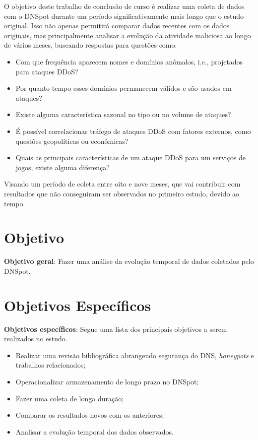 O objetivo deste trabalho de conclusão de curso é realizar uma coleta de
dados com o DNSpot durante um período significativamente mais longo
que o estudo original. Isso não apenas permitirá comparar dados
recentes com os dados originais, mas principalmente analisar a
evolução da atividade maliciosa ao longo de vários meses, buscando
respostas para questões como:

\begin{itemize}
\item Com que frequência aparecem nomes e domínios anômalos, i.e.,
  projetados para ataques DDoS?
\item Por quanto tempo esses domínios permanecem válidos e são usados
  em ataques?
\item Existe alguma característica sazonal no tipo ou no volume de
  ataques?
\item É possível correlacionar tráfego de ataques DDoS com fatores
  externos, como questões geopolíticas ou econômicas?
  
\item Quais as principais características de um ataque DDoS para um  serviços de jogos, existe alguma diferença?

\end{itemize}

Visando um período de coleta entre oito e nove meses, que vai contribuir com resultados que não
conseguiram ser observados no primeiro estudo, devido ao tempo.


\section{Objetivo}
\label{sec:objetivo}

\textbf{Objetivo geral}: Fazer uma análise da evolução temporal de dados coletados pelo DNSpot.


\section{Objetivos Específicos}
\label{sec:objetivos_especificos}

\noindent\textbf{Objetivos específicos}: 
Segue uma lista dos principais objetivos a serem realizados no estudo.
\begin{itemize}
    \item Realizar uma revisão bibliográfica abrangendo segurança do DNS,
  \textit{honeypots} e trabalhos relacionados;
    \item Operacionalizar armazenamento de longo prazo no DNSpot;
    \item Fazer uma coleta de longa duração;
    \item Comparar os resultados novos com os anteriores;
    \item Analisar a evolução temporal dos dados observados.
\end{itemize}


